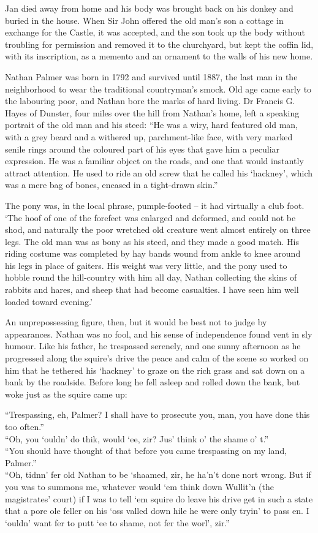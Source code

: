 Jan died away from home and his body was brought back on his donkey and buried in the house. When Sir John offered the old man's son a cottage in exchange for the Castle, it was accepted, and the son took up the body without troubling for permission and removed it to the churchyard, but kept the coffin lid, with its inscription, as a memento and an ornament to the walls of his new home.

Nathan Palmer was born in 1792 and survived until 1887, the last man in the neighborhood to wear the traditional countryman’s smock. Old age came early to the labouring poor, and Nathan bore the marks of hard living. Dr Francis G. Hayes of Dunster, four miles over the hill from Nathan’s home, left a speaking portrait of the old man and his steed: “He was a wiry, hard featured old man, with a grey beard and a withered up, parchment-like face, with very marked senile rings around the coloured part of his eyes that gave him a peculiar expression. He was a familiar object on the roads, and one that would instantly attract attention. He used to ride an old screw that he called his ‘hackney’, which was a mere bag of bones, encased in a tight-drawn skin.”

The pony was, in the local phrase, pumple-footed – it had virtually a club foot. ‘The hoof of one of the forefeet was enlarged and deformed, and could not be shod, and naturally the poor wretched old creature went almost entirely on three legs. The old man was as bony as his steed, and they made a good match. His riding costume was completed by hay bands wound from ankle to knee around his legs in place of gaiters. His weight was very little, and the pony used to hobble round the hill-country with him all day, Nathan collecting the skins of rabbits and hares, and sheep that had become casualties. I have seen him well loaded toward evening.’

An unprepossessing figure, then, but it would be best not to judge by appearances. Nathan was no fool, and his sense of independence found vent in sly humour. Like his father, he trespassed serenely, and one sunny afternoon as he progressed along the squire’s drive the peace and calm of the scene so worked on him that he tethered his ‘hackney’ to graze on the rich grass and sat down on a bank by the roadside. Before long he fell asleep and rolled down the bank, but woke just as the squire came up:

 “Trespassing, eh, Palmer? I shall have to prosecute you, man, you have done this too often.”\\
 “Oh, you ‘ouldn’ do thik, would ‘ee, zir? Jus’ think o’ the shame o’ t.”\\
 “You should have thought of that before you came trespassing on my land, Palmer.”\\
 “Oh, tidnn’ fer old Nathan to be ‘shaamed, zir, he ha’n’t done nort wrong. But if you was to summons me, whatever would ‘em think down Wullit’n (the magistrates’ court) if I was to tell ‘em squire do leave his drive get in such a state that a pore ole feller on his ‘oss valled down hile he were only tryin’ to pass en. I ‘ouldn’ want fer to putt ‘ee to shame, not fer the worl’, zir.”\\
 
